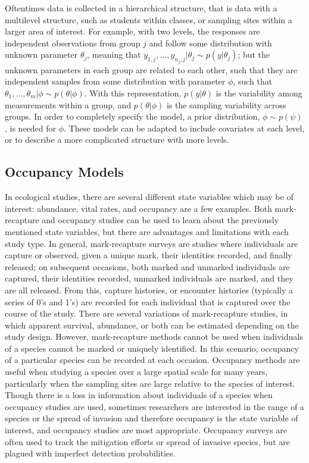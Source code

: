 \documentclass[12pt]{article}\usepackage[]{graphicx}\usepackage[]{color}
\begin{document}
Oftentimes data is collected in a hierarchical structure, that is data with a multilevel structure, such as students within classes, or sampling sites within a larger area of interest. For example, with two levels, the responses are independent observations from group $j$ and follow some distribution with unknown parameter $\theta_j$, meaning that $y_{1, j}, \dots, y_{n_j, j}|\theta_j \sim p(y|\theta_j)$; but the unknown parameters in each group are related to each other, such that they are independent samples from some distribution with parameter $\phi$, such that $\theta_1, \dots, \theta_m|\phi \sim p(\theta|\phi)$. With this representation, $p(y|\theta)$ is the variability among measurements within a group, and $p(\theta|\phi)$ is the sampling variability across groups. In order to completely specify the model, a prior distribution, $\phi \sim p(\psi)$, is needed for $\phi$. These models can be adapted to include covariates at each level, or to describe a more complicated structure with more levels. 

\subsection{Occupancy Models}

In ecological studies, there are several different state variables which may be of interest: abundance, vital rates, and occupancy are a few examples. Both mark-recapture and occupancy studies can be used to learn about the previously mentioned state variables, but there are advantages and limitations with each study type. In general, mark-recapture surveys are studies where individuals are capture or observed, given a unique mark, their identities recorded, and finally released; on subsequent occasions, both marked and unmarked individuals are captured, their identities recorded, unmarked individuals are marked, and they are all released. From this, capture histories, or encounter histories (typically a series of 0's and 1's) are recorded for each individual that is captured over the course of the study. There are several variations of mark-recapture studies, in which apparent survival, abundance, or both can be estimated depending on the study design. However, mark-recapture methods cannot be used when individuals of a species cannot be marked or uniquely identified. In this scenario, occupancy of a particular species can be recorded at each occasion. Occupancy methods are useful when studying a species over a large spatial scale for many years, particularly when the sampling sites are large relative to the species of interest. Though there is a loss in information about individuals of a species when occupancy studies are used, sometimes researchers are interested in the range of a species or the spread of invasion and therefore occupancy is the state variable of interest, and occupancy studies are most appropriate. Occupancy surveys are often used to track the mitigation efforts or spread of invasive species, but are plagued with imperfect detection probabilities. 
\end{document}
